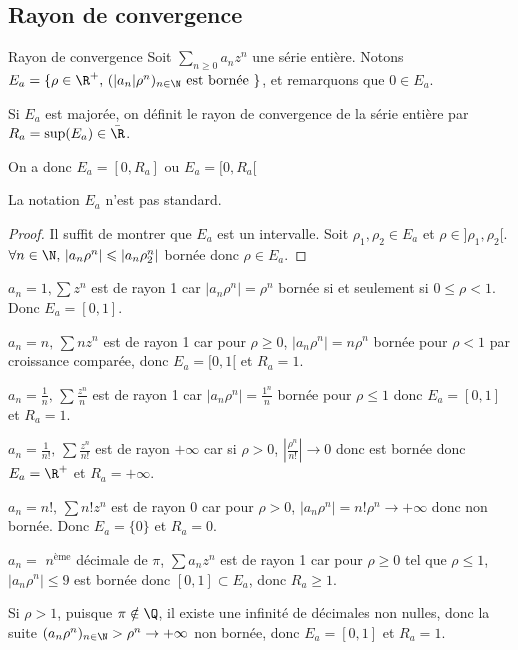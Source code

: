 \subsection{Rayon de convergence }

\begin{theoreme}{Rayon de convergence}{}
    Soit $\sum_{n \geqslant 0} a_n z^n$ une série entière. Notons $E_a = \{\rho \in \R^+, \, (|a_n|\rho^n)_{n \in \N} \text{ est bornée }\}$,
    et remarquons que $0 \in E_a$.

    \svspace Si $E_a$ est majorée, on définit le rayon de convergence de la série entière par $R_a = \sup(E_a) \in \bar \R$.

    On a donc $E_a = [0, R_a]$ ou $E_a = [0, R_a[$ 
\end{theoreme}

\begin{remarque}
    La notation $E_a$ n'est pas standard.
\end{remarque}


\begin{proof}
    Il suffit de montrer que $E_a$ est un intervalle. Soit $\rho_1, \rho_2 \in E_a$ et 
    $\rho \in ]\rho_1, \rho_2[$. $\forall n \in \N, \, |a_n \rho^n| \leqslant |a_n \rho_2^n|$ bornée donc $\rho \in E_a$.


\end{proof}



\begin{exemple}
    $a_n = 1, \sum z^n$ est de rayon 1 car $|a_n \rho^n| = \rho^n$ bornée si et seulement si $0 \leqslant \rho < 1$.
    Donc $E_a = [0, 1]$. 

    \lvspace $a_n = n, \, \sum n z^n$ est de rayon 1 car pour $\rho \geqslant 0$, $|a_n \rho^n| = n \rho^n$ bornée
    pour $\rho < 1$ par croissance comparée, donc $E_a = [0, 1[$ et $R_a = 1$.

    \lvspace $a_n = \frac 1 n, \, \sum \frac{z^n}{n}$ est de rayon 1 car 
    $|a_n \rho^n| = \frac{1^n} n $ bornée pour $\rho \leqslant 1$ donc $E_a = [0, 1]$ et $R_a = 1$.

    \lvspace $a_n = \frac 1 {n!}, \, \sum \frac{z^n}{n!}$ est de rayon $+\infty$ car
    si $\rho > 0$, $|\frac{\rho^n} {n!}| \to 0$ donc est bornée donc 
    $E_a = \R^+$ et $R_a = +\infty$.
    
    \lvspace $a_n = n!, \, \sum n! z^n$ est de rayon 0 car pour $\rho > 0$,
    $|a_n \rho^n| = n! \rho^n \to +\infty$ donc non bornée. Donc $E_a = \{0\}$ et $R_a = 0$.

    \lvspace $a_n = $ $n^{\text{ème}}$ décimale de $\pi$, $\sum a_n z^n$ est de rayon 1 car
    pour $\rho \geqslant 0$ tel que $\rho \leqslant 1$, $|a_n \rho^n| \leqslant 9$ est bornée 
    donc $[0, 1] \subset E_a$, donc $R_a \geqslant 1$.

    Si $\rho > 1$, puisque $\pi \notin \Q$, il existe une infinité de décimales non nulles, 
    donc la suite $(a_n \rho^n)_{n \in \N} > \rho^n \to + \infty $ non bornée, 
    donc $E_a = [0, 1]$ et $R_a = 1$. 
\end{exemple}

